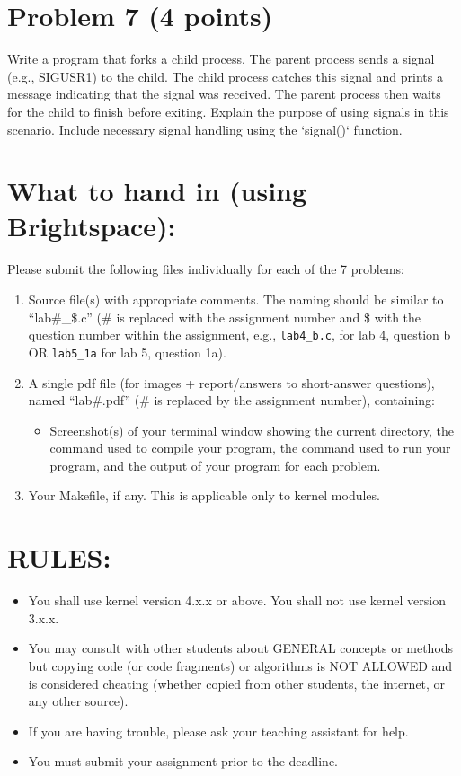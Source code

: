 \documentclass{article}
\begin{document}
\section*{Problem 7 (4 points)}

Write a program that forks a child process. The parent process sends a signal (e.g., SIGUSR1) to the child. The child process catches this signal and prints a message indicating that the signal was received. The parent process then waits for the child to finish before exiting.  Explain the purpose of using signals in this scenario.  Include necessary signal handling using the `signal()` function.

\section*{What to hand in (using Brightspace): }

Please submit the following files individually for each of the 7 problems:

\begin{enumerate}
    \item Source file(s) with appropriate comments. The naming should be similar to “lab\#\_\$.c” (\# is replaced with the assignment number and \$ with the question number within the assignment, e.g., \texttt{lab4\_b.c}, for lab 4, question b OR \texttt{lab5\_1a} for lab 5, question 1a).
    \item A single pdf file (for images + report/answers to short-answer questions), named “lab\#.pdf” (\# is replaced by the assignment number), containing:
    \begin{itemize}
        \item Screenshot(s) of your terminal window showing the current directory, the command used to compile your program, the command used to run your program, and the output of your program for each problem.
    \end{itemize}
    \item Your Makefile, if any. This is applicable only to kernel modules.
\end{enumerate}


\section*{RULES:}

\begin{itemize}
    \item You shall use kernel version 4.x.x or above. You shall not use kernel version 3.x.x.
    \item You may consult with other students about GENERAL concepts or methods but copying code (or code fragments) or algorithms is NOT ALLOWED and is considered cheating (whether copied from other students, the internet, or any other source).
    \item If you are having trouble, please ask your teaching assistant for help.
    \item You must submit your assignment prior to the deadline.
\end{itemize}
\end{document}
